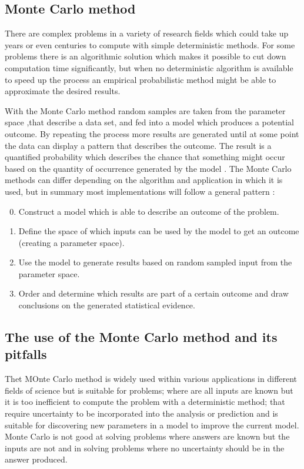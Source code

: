 \subsection{Monte Carlo method}
There are complex problems in a variety of research fields which could take up years or even centuries to compute with simple deterministic methods. For some problems there is an algorithmic solution which makes it possible to cut down computation time significantly, but when no deterministic algorithm is available to speed up the process an empirical probabilistic method might be able to approximate the desired results. 

With the Monte Carlo method random samples are taken from the parameter space ,that describe a data set, and fed into a model which produces a potential outcome. By repeating the process more results are generated until at some point the data can display a pattern that describes the outcome. The result is a quantified probability which describes the chance that something might occur based on the quantity of occurrence generated by the model \cite{stephanie_monte_2015,wikipedia_monte_2019,wikipedia_monte-carlosimulatie_2018}.
\newline
\newline
The Monte Carlo methods can differ depending on the algorithm and application in which it is used, but in summary most implementations will follow a general pattern \cite{wikipedia_monte_2019}:
\begin{enumerate}
	\setcounter{enumi}{-1}
	\item Construct a model which is able to describe an outcome of the problem.
	\item Define the space of which inputs can be used by the model to get an outcome (creating a parameter space). 
	\item Use the model to generate results based on random sampled input from the parameter space.
	\item Order and determine which results are part of a certain outcome and draw conclusions on the generated statistical evidence.
\end{enumerate}

\label{subsec:Monte_Carlo_Method}

\subsection{The use of the Monte Carlo method and its pitfalls}
Thet MOnte Carlo method is widely used within various applications in different fields of science but is suitable for problems; where are all inputs are known but it is too inefficient to compute the problem with a deterministic method; that require uncertainty to be incorporated into the analysis or prediction and is suitable for discovering new parameters in a model to improve the current model. Monte Carlo is not good at solving problems where answers are known but the inputs are not and in solving problems where no uncertainty should be in the answer produced.

